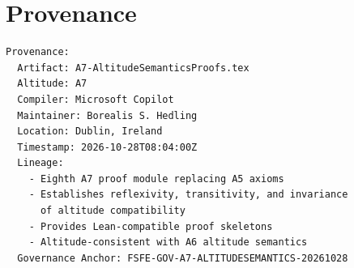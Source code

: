 \documentclass[11pt]{article}
\begin{document}
\newpage


\section*{Provenance}

\begin{verbatim}
Provenance:
  Artifact: A7-AltitudeSemanticsProofs.tex
  Altitude: A7
  Compiler: Microsoft Copilot
  Maintainer: Borealis S. Hedling
  Location: Dublin, Ireland
  Timestamp: 2026-10-28T08:04:00Z
  Lineage:
    - Eighth A7 proof module replacing A5 axioms
    - Establishes reflexivity, transitivity, and invariance
      of altitude compatibility
    - Provides Lean-compatible proof skeletons
    - Altitude-consistent with A6 altitude semantics
  Governance Anchor: FSFE-GOV-A7-ALTITUDESEMANTICS-20261028
\end{verbatim}
\end{document}
